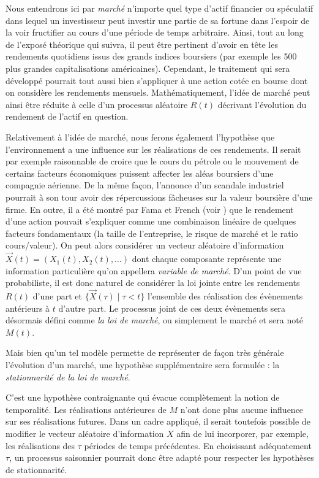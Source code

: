 Nous entendrons ici par \textit{marché} n'importe quel type d'actif financier ou
spéculatif dans lequel un investisseur peut investir une partie de sa fortune dans
l'espoir de la voir fructifier au cours d'une période de temps arbitraire. Ainsi, tout au
long de l'exposé théorique qui suivra, il peut être pertinent d'avoir en tête les
rendements quotidiens issus des grands indices boursiers (par exemple les 500 plus grandes
capitalisations américaines). Cependant, le traitement qui sera développé pourrait tout
aussi bien s'appliquer à une action cotée en bourse dont on considère les rendements
mensuels.  Mathématiquement, l'idée de marché peut ainsi être réduite à celle d'un
processus aléatoire $R(t)$ décrivant l'évolution du rendement de l'actif en question.

Relativement à l'idée de marché, nous ferons également l'hypothèse que l'environnement a
une influence sur les réalisations de ces rendements. Il serait par exemple raisonnable de
croire que le cours du pétrole ou le mouvement de certains facteurs économiques puissent
affecter les aléas boursiers d'une compagnie aérienne. De la même façon, l'annonce d'un
scandale industriel pourrait à son tour avoir des répercussions fâcheuses sur la valeur
boursière d'une firme. En outre, il a été montré par Fama et French (voir
\cite{fama1996multifactor}) que le rendement d'une action pouvait s'expliquer comme une
combinaison linéaire de quelques facteurs fondamentaux (la taille de l'entreprise, le
risque de marché et le ratio cours/valeur). On peut alors considérer un vecteur aléatoire
d'information $\vec X(t) = (X_1(t), X_2(t), \dots)$ dont chaque composante représente une
information particulière qu'on appellera \textit{variable de marché}. D'un point de vue
probabiliste, il est donc naturel de considérer la loi jointe entre les rendements $R(t)$
d'une part et $\{\vec X(\tau) \mid \tau < t\}$ l'ensemble des réalisation des évènements antérieurs
à $t$ d'autre part. Le processus joint de ces deux évènements sera désormais défini comme
\textit{la loi de marché}, ou simplement le marché et sera noté $M(t)$.


Mais bien qu'un tel modèle permette de représenter de façon très générale l'évolution d'un
marché, une hypothèse supplémentaire sera formulée : la \textit{stationnarité de la loi de
  marché}.

C'est une hypothèse contraignante qui évacue complètement la notion de temporalité. Les
réalisations antérieures de $M$ n'ont donc plus aucune influence sur ses réalisations
futures. Dans un cadre appliqué, il serait toutefois possible de modifier le vecteur
aléatoire d'information $X$ afin de lui incorporer, par exemple, les réalisations des
$\tau$ périodes de temps précédentes. En choisissant adéquatement $\tau$, un processus
saisonnier pourrait donc être adapté pour respecter les hypothèses de stationnarité.

